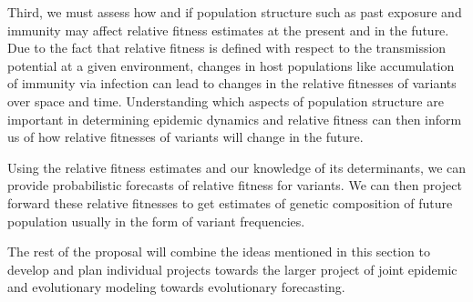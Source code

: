 Third, we must assess how and if population structure such as past exposure and immunity may affect relative fitness estimates at the present and in the future.
Due to the fact that relative fitness is defined with respect to the transmission potential at a given environment, changes in host populations like accumulation of immunity via infection can lead to changes in the relative fitnesses of variants over space and time.
Understanding which aspects of population structure are important in determining epidemic dynamics and relative fitness can then inform us of how relative fitnesses of variants will change in the future.

Using the relative fitness estimates and our knowledge of its determinants, we can provide probabilistic forecasts of relative fitness for variants.
We can then project forward these relative fitnesses to get estimates of genetic composition of future population usually in the form of variant frequencies.

The rest of the proposal will combine the ideas mentioned in this section to develop and plan individual projects towards the larger project of joint epidemic and evolutionary modeling towards evolutionary forecasting.
